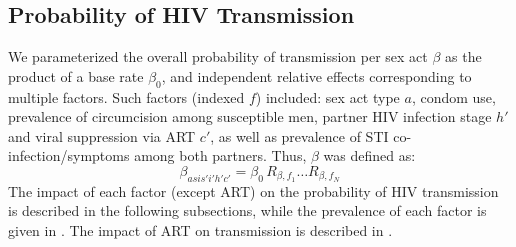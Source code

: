 \subsection{Probability of HIV Transmission}\label{mod.par.beta}
We parameterized the overall probability of transmission per sex act $\beta$ as
the product of a base rate $\beta_0$,
and independent relative effects corresponding to multiple factors.
Such factors (indexed $f$) included:
sex act type $a$, condom use, prevalence of circumcision among susceptible men,
partner HIV infection stage $h'$ and viral suppression via ART $c'$,
as well as prevalence of STI co-infection/symptoms among both partners.
Thus, $\beta$ was defined as:
\begin{equation}\label{eq:model.beta}
  \beta_{asis'i'h'c'} = \beta_0 \, R_{\beta,f_1} \dots R_{\beta,f_N}
\end{equation}
The impact of each factor (except ART) on the probability of HIV transmission
is described in the following subsections,
while the prevalence of each factor is given in .
The impact of ART on transmission is described in .
